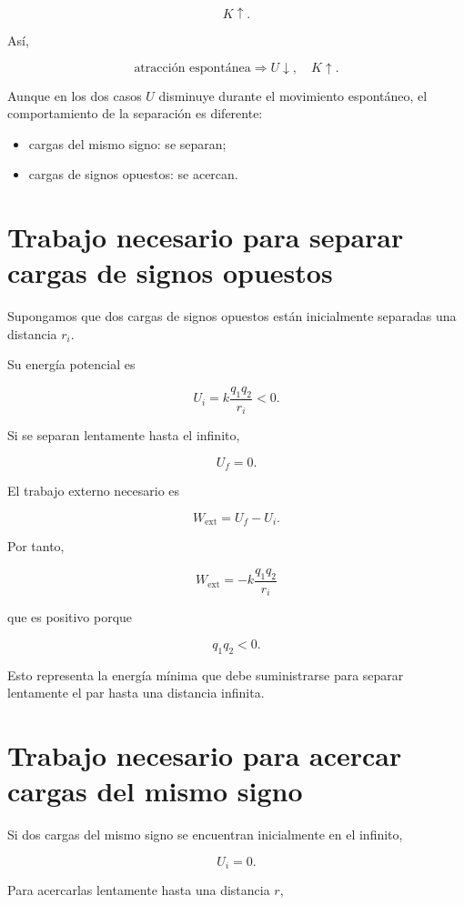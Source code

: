 \[
K\uparrow.
\]

Así,

\[
\boxed{
\text{atracción espontánea}
\Longrightarrow
U\downarrow,\quad K\uparrow
}.
\]

Aunque en los dos casos \(U\) disminuye durante el movimiento espontáneo, el
comportamiento de la separación es diferente:

\begin{itemize}
    \item cargas del mismo signo: se separan;
    \item cargas de signos opuestos: se acercan.
\end{itemize}


\section{Trabajo necesario para separar cargas de signos opuestos}

Supongamos que dos cargas de signos opuestos están inicialmente separadas una distancia
\(r_i\).

Su energía potencial es

\[
U_i=k\frac{q_1q_2}{r_i}<0.
\]

Si se separan lentamente hasta el infinito,

\[
U_f=0.
\]

El trabajo externo necesario es

\[
W_{\text{ext}}=U_f-U_i.
\]

Por tanto,

\begin{equation}
\boxed{
W_{\text{ext}}
=
-k\frac{q_1q_2}{r_i}
}
\label{eq:trabajo_separar_opuestas}
\end{equation}

que es positivo porque

\[
q_1q_2<0.
\]

Esto representa la energía mínima que debe suministrarse para separar lentamente el
par hasta una distancia infinita.


\section{Trabajo necesario para acercar cargas del mismo signo}

Si dos cargas del mismo signo se encuentran inicialmente en el infinito,

\[
U_i=0.
\]

Para acercarlas lentamente hasta una distancia \(r\),


